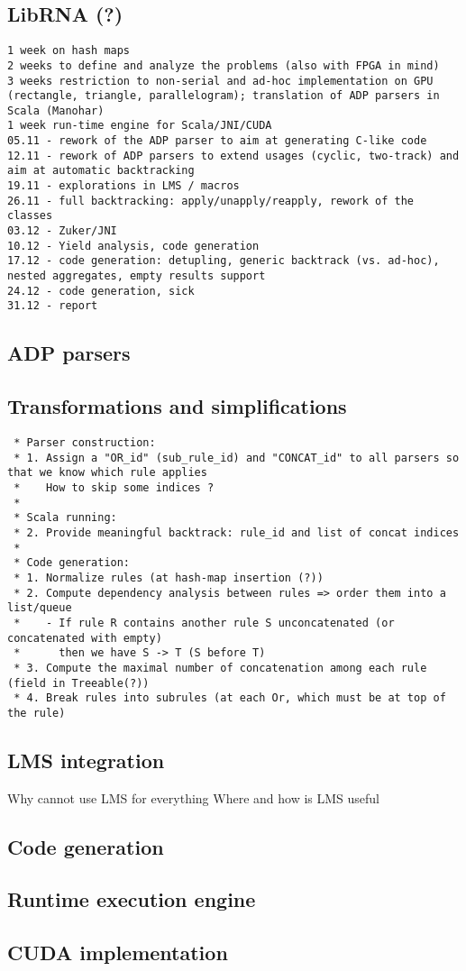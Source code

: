 \subsection{LibRNA (?)}

\begin{verbatim}
1 week on hash maps
2 weeks to define and analyze the problems (also with FPGA in mind)
3 weeks restriction to non-serial and ad-hoc implementation on GPU (rectangle, triangle, parallelogram); translation of ADP parsers in Scala (Manohar)
1 week run-time engine for Scala/JNI/CUDA
05.11 - rework of the ADP parser to aim at generating C-like code
12.11 - rework of ADP parsers to extend usages (cyclic, two-track) and aim at automatic backtracking
19.11 - explorations in LMS / macros
26.11 - full backtracking: apply/unapply/reapply, rework of the classes
03.12 - Zuker/JNI
10.12 - Yield analysis, code generation
17.12 - code generation: detupling, generic backtrack (vs. ad-hoc), nested aggregates, empty results support
24.12 - code generation, sick
31.12 - report
\end{verbatim}


\subsection{ADP parsers}
\subsection{Transformations and simplifications}

\begin{verbatim}
 * Parser construction:
 * 1. Assign a "OR_id" (sub_rule_id) and "CONCAT_id" to all parsers so that we know which rule applies
 *    How to skip some indices ?
 *
 * Scala running:
 * 2. Provide meaningful backtrack: rule_id and list of concat indices
 *
 * Code generation:
 * 1. Normalize rules (at hash-map insertion (?))
 * 2. Compute dependency analysis between rules => order them into a list/queue
 *    - If rule R contains another rule S unconcatenated (or concatenated with empty)
 *      then we have S -> T (S before T)
 * 3. Compute the maximal number of concatenation among each rule (field in Treeable(?))
 * 4. Break rules into subrules (at each Or, which must be at top of the rule)
\end{verbatim}

\subsection{LMS integration}
Why cannot use LMS for everything
Where and how is LMS useful

\subsection{Code generation}

\subsection{Runtime execution engine}

\subsection{CUDA implementation}

